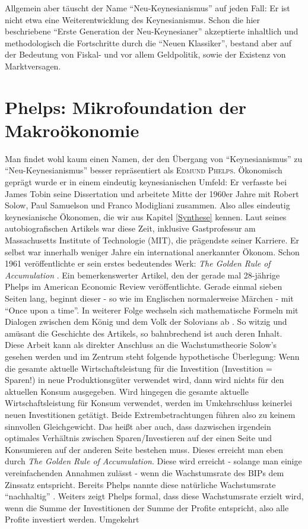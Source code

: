 Allgemein aber täuscht der Name "`Neu-Keynesianismus"' auf jeden Fall: Er ist nicht etwa eine Weiterentwicklung des Keynesianismus. Schon die hier beschriebene "`Erste Generation der Neu-Keynesianer"' akzeptierte inhaltlich und methodologisch die Fortschritte durch die "`Neuen Klassiker"', bestand aber auf der Bedeutung von Fiskal- und vor allem Geldpolitik, sowie der Existenz von Marktversagen. 

 

\section{Phelps: Mikrofoundation der Makroökonomie}
\label{micmac}

Man findet wohl kaum einen Namen, der den Übergang von "`Keynesianismus"' zu "`Neu-Keynesianismus"' besser repräsentiert als \textsc{Edmund Phelps}. Ökonomisch geprägt wurde er in einem eindeutig keynesianischen Umfeld: Er verfasste bei James Tobin seine Dissertation und arbeitete Mitte der 1960er Jahre mit Robert Solow, Paul Samuelson und Franco Modigliani zusammen. Also alles eindeutig keynesianische Ökonomen, die wir aus Kapitel \ref{Synthese} kennen. Laut seines autobiografischen Artikels \textcite[S. 93]{Heertje1995} war diese Zeit, inklusive Gastprofessur am Massachusetts Institute of Technologie (MIT), die prägendste seiner Karriere. Er selbst war innerhalb weniger Jahre ein international anerkannter Ökonom. Schon 1961 veröffentlichte er sein erstes bedeutendes Werk: \textit{The Golden Rule of Accumulation} \parencite{Phelps1961}. Ein bemerkenswerter Artikel, den der gerade mal 28-jährige Phelps im American Economic Review veröffentlichte. Gerade einmal sieben Seiten lang, beginnt dieser - so wie im Englischen normalerweise Märchen  - mit "`Once upon a time"'. In weiterer Folge wechseln sich mathematische Formeln mit Dialogen zwischen dem König und dem Volk der Solovians ab \parencite[S. 640]{Phelps1961}. So witzig und amüsant die Geschichte des Artikels, so bahnbrechend ist auch deren Inhalt. Diese Arbeit kann als direkter Anschluss an die Wachstumstheorie Solow's gesehen werden und im Zentrum steht folgende hypothetische Überlegung: Wenn die gesamte aktuelle Wirtschaftsleistung für die Investition (Investition = Sparen!) in neue Produktionsgüter verwendet wird, dann wird nichts für den aktuellen Konsum ausgegeben. Wird hingegen die gesamte aktuelle Wirtschaftsleistung für Konsum verwendet, werden im Umkehrschluss keinerlei neuen Investitionen getätigt. Beide Extrembetrachtungen führen also zu keinem sinnvollen Gleichgewicht. Das heißt aber auch, dass dazwischen irgendein optimales Verhältnis zwischen Sparen/Investieren auf der einen Seite und Konsumieren auf der anderen Seite bestehen muss. Dieses erreicht man eben durch \textit{The Golden Rule of Accumulation}. Diese wird erreicht - solange man einige vereinfachenden Annahmen zulässt - wenn die Wachstumsrate des BIPs dem Zinssatz entspricht. Bereits Phelps nannte diese natürliche Wachstumsrate "`nachhaltig"' \parencite[S. 638]{Phelps1961}. Weiters zeigt Phelps formal, dass diese Wachstumsrate erzielt wird, wenn die Summe der Investitionen der Summe der Profite entspricht, also alle Profite investiert werden. Umgekehrt 